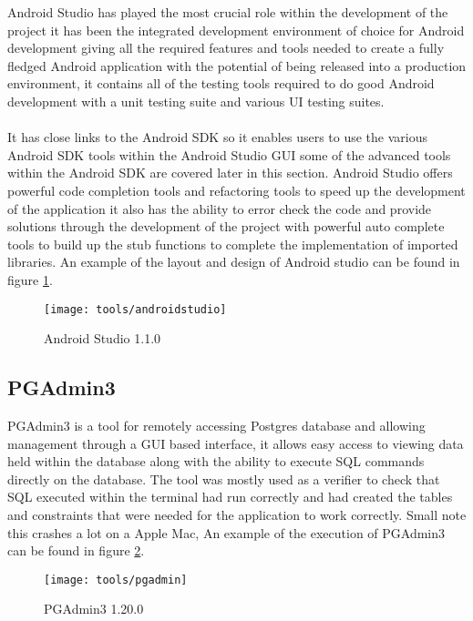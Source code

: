 Android Studio has played the most crucial role within the development of the project it has been the integrated development environment of choice for Android development giving all the required features and tools needed to create a fully fledged Android application with the potential of being released into a production environment, it contains all of the testing tools required to do good Android development with a unit testing suite and various UI testing suites.\\
\\
It has close links to the Android SDK so it enables users to use the various Android SDK tools within the Android Studio GUI some of the advanced tools within the Android SDK are covered later in this section. Android Studio offers powerful code completion tools and refactoring tools to speed up the development of the application it also has the ability to error check the code and provide solutions through the development of the project with powerful auto complete tools to build up the stub functions to complete the implementation of imported libraries. An example of the layout and design of Android studio can be found in figure \ref{fig:android_studio_image}.

\begin{figure}[H]
    \centering
    \texttt{[image: tools/androidstudio]}
    \caption{Android Studio 1.1.0}
    \label{fig:android_studio_image}
\end{figure} 

\subsection*{PGAdmin3}

PGAdmin3 is a tool for remotely accessing Postgres database and allowing management through a GUI based interface, it allows easy access to viewing data held within the database along with the ability to execute SQL commands directly on the database. The tool was mostly used as a verifier to check that SQL executed within the terminal had run correctly and had created the tables and constraints that were needed for the application to work correctly. Small note this crashes a lot on a Apple Mac, An example of the execution of PGAdmin3 can be found in figure \ref{fig:pg_admin_image}.

\begin{figure}[H]
    \centering
    \texttt{[image: tools/pgadmin]}
    \caption{PGAdmin3 1.20.0}
    \label{fig:pg_admin_image}
\end{figure} 

